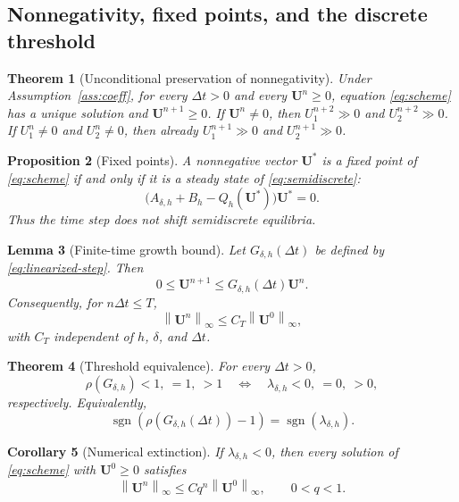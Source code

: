 \documentclass[11pt]{article}
\newtheorem{theorem}{Theorem}[section]
\newtheorem{lemma}[theorem]{Lemma}
\newtheorem{proposition}[theorem]{Proposition}
\newtheorem{corollary}[theorem]{Corollary}
\theoremstyle{definition}
\newcommand{\norm}[1]{\left\lVert #1\right\rVert}
\newcommand{\U}{\bm U}
\begin{document}
\subsection{Nonnegativity, fixed points, and the discrete threshold}

\begin{theorem}[Unconditional preservation of nonnegativity]
\label{thm:nonnegativity}
Under Assumption~\ref{ass:coeff}, for every $\Delta t>0$ and every $\U^n\ge0$, equation \eqref{eq:scheme} has a unique solution and $\U^{n+1}\ge0$.  If $\U^n\ne0$, then $U_1^{n+2}\gg0$ and $U_2^{n+2}\gg0$.  If $U_1^n\ne0$ and $U_2^n\ne0$, then already $U_1^{n+1}\gg0$ and $U_2^{n+1}\gg0$.
\end{theorem}

\begin{proposition}[Fixed points]
\label{prop:fixed-points}
A nonnegative vector $\U^*$ is a fixed point of \eqref{eq:scheme} if and only if it is a steady state of \eqref{eq:semidiscrete}:
\[
 \big(A_{\delta,h}+B_h-Q_h(\U^*)\big)\U^*=0.
\]
Thus the time step does not shift semidiscrete equilibria.
\end{proposition}

\begin{lemma}[Finite-time growth bound]
\label{lem:finite-bound}
Let $G_{\delta,h}(\Delta t)$ be defined by \eqref{eq:linearized-step}.  Then
\begin{equation}
\label{eq:comparison-G}
 0\le\U^{n+1}\le G_{\delta,h}(\Delta t)\U^n.
\end{equation}
Consequently, for $n\Delta t\le T$,
\[
 \norm{\U^n}_\infty
 \le C_T\norm{\U^0}_\infty,
\]
with $C_T$ independent of $h$, $\delta$, and $\Delta t$.
\end{lemma}

\begin{theorem}[Threshold equivalence]
\label{thm:threshold-equivalence}
For every $\Delta t>0$,
\begin{equation}
\label{eq:threshold-equivalence}
 \rho(G_{\delta,h})<1,\ =1,\ >1
 \quad\Longleftrightarrow\quad
 \lambda_{\delta,h}<0,\ =0,\ >0,
\end{equation}
respectively.  Equivalently,
\[
 \operatorname{sgn}\!\left(\rho(G_{\delta,h}(\Delta t))-1\right)
 =
 \operatorname{sgn}(\lambda_{\delta,h}).
\]
\end{theorem}

\begin{corollary}[Numerical extinction]
\label{cor:extinction}
If $\lambda_{\delta,h}<0$, then every solution of \eqref{eq:scheme} with $\U^0\ge0$ satisfies
\[
 \norm{\U^n}_\infty
 \le Cq^n\norm{\U^0}_\infty,
 \qquad 0<q<1.
\]
\end{corollary}
\end{document}
